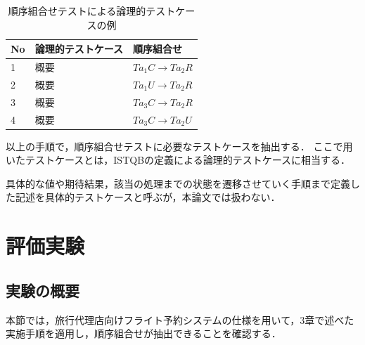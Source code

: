 \begin{table}[t]
  \centering
  \caption{順序組合せテストによる論理的テストケースの例}
    \begin{tabular}{l|l|l}
    No & 論理的テストケース & 順序組合せ \\
    \hline
    1 & 概要 & $Ta_1C \rightarrow Ta_2R$ \\
    \hline
    2 & 概要 & $Ta_1U \rightarrow Ta_2R$ \\
    \hline
    3 & 概要 & $Ta_3C \rightarrow Ta_2R$ \\
    \hline
    4 & 概要 & $Ta_3C \rightarrow Ta_2U$ \\
    \hline
    \end{tabular}%
\label{TCLISTSAMPLE}
\end{table}%

以上の手順で，順序組合せテストに必要なテストケースを抽出する．
ここで用いたテストケースとは，ISTQBの定義による論理的テストケースに相当する\cite{ISTQB}．

具体的な値や期待結果，該当の処理までの状態を遷移させていく手順まで定義した記述を具体的テストケースと呼ぶが，本論文では扱わない．
\section{評価実験} \label{sec:5-3}
\subsection{実験の概要} \label{sec:5-3-1}

本節では，旅行代理店向けフライト予約システムの仕様を用いて，3章で述べた実施手順を適用し，順序組合せが抽出できることを確認する．


